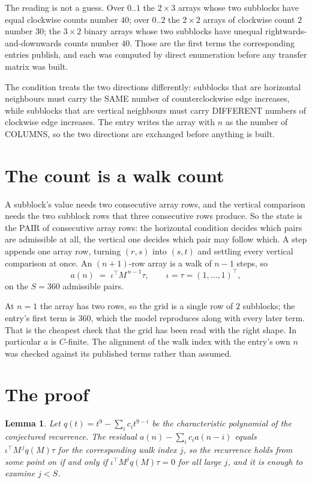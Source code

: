 \documentclass[11pt,a4paper]{article}
\theoremstyle{plain}
\newtheorem{lemma}[theorem]{Lemma}
\theoremstyle{definition}
\begin{document}
The reading is not a guess. Over $0..1$ the $2\times3$ arrays whose two subblocks have equal
clockwise counts number $40$; over $0..2$ the $2\times2$ arrays of clockwise count $2$ number
$30$; the $3\times2$ binary arrays whose two subblocks have unequal rightwards-and-downwards
counts number $40$. Those are the first terms the corresponding entries publish, and each was
computed by direct enumeration before any transfer matrix was built.

The condition treats the two directions differently: subblocks that are horizontal neighbours
must carry the SAME number of counterclockwise edge increases, while subblocks that are vertical neighbours must carry
DIFFERENT numbers of clockwise edge increases. The entry writes the array with $n$ as the number of COLUMNS, so the two directions are exchanged before anything is built.

\section{The count is a walk count}

A subblock's value needs two consecutive array rows, and the vertical
comparison needs the two subblock rows that three consecutive rows produce. So the state is the
PAIR of consecutive array rows: the horizontal condition decides which pairs are admissible at
all, the vertical one decides which pair may follow which. A step appends one array row,
turning $(r,s)$ into $(s,t)$ and settling every vertical comparison at once. An $(n+1)$-row
array is a walk of $n-1$ steps, so
\[
a(n)\;=\;\iota^{\!\top}M^{\,n-1}\tau,\qquad\iota=\tau=(1,\dots,1)^{\!\top},
\]
on the $S=360$ admissible pairs.

At $n=1$ the array has two rows, so the grid is a single row of $2$
subblocks; the entry's first term is $360$, which the model
reproduces along with every later term. That is the cheapest check that the grid has been read
with the right shape.
In particular $a$ is $C$-finite. The alignment of the walk index with the entry's own $n$ was
checked against its published terms rather than assumed.

\section{The proof}

\begin{lemma}\label{lem:crit}
Let $q(t)=t^{9}-\sum_i c_it^{9-i}$ be the characteristic polynomial of the
conjectured recurrence. The residual $a(n)-\sum_ic_ia(n-i)$ equals
$\iota^{\!\top}M^{\,j}q(M)\tau$ for the corresponding walk index $j$, so the recurrence
holds from some point on if and only if $\iota^{\!\top}M^{j}q(M)\tau=0$ for all large $j$,
and it is enough to examine $j<S$.
\end{lemma}
\end{document}

